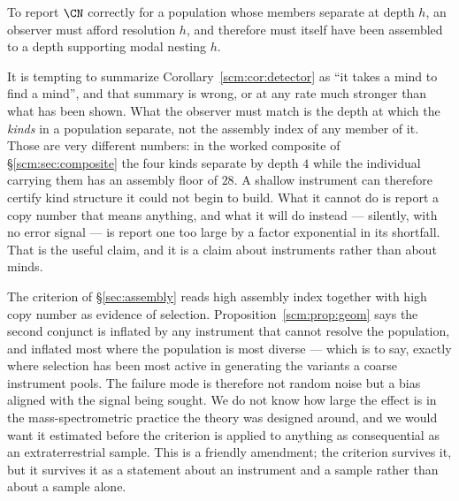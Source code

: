 \begin{corollary}
\label{scm:cor:detector}
To report $\CN$ correctly for a population whose members separate at depth
$h$, an observer must afford resolution $h$, and therefore must itself
have been assembled to a depth supporting modal nesting $h$.
\end{corollary}

\begin{remark}
\label{scm:rmk:notthatfar}
It is tempting to summarize Corollary~\ref{scm:cor:detector} as ``it takes
a mind to find a mind'', and that summary is wrong, or at any rate much
stronger than what has been shown. What the observer must match is the
depth at which the \emph{kinds} in a population separate, not the assembly
index of any member of it. Those are very different numbers: in the worked
composite of \S\ref{scm:sec:composite} the four kinds separate by depth
$4$ while the individual carrying them has an assembly floor of $28$. A
shallow instrument can therefore certify kind structure it could not begin
to build. What it cannot do is report a copy number that means anything,
and what it will do instead --- silently, with no error signal --- is
report one too large by a factor exponential in its shortfall. That is the
useful claim, and it is a claim about instruments rather than about minds.
\end{remark}

\begin{remark}
\label{scm:rmk:falsepos}
The criterion of \S\ref{sec:assembly} reads high assembly index together
with high copy number as evidence of selection.
Proposition~\ref{scm:prop:geom} says the second conjunct is inflated by
any instrument that cannot resolve the population, and inflated most where
the population is most diverse --- which is to say, exactly where selection
has been most active in generating the variants a coarse instrument pools.
The failure mode is therefore not random noise but a bias aligned with the
signal being sought. We do not know how large the effect is in the
mass-spectrometric practice the theory was designed around, and we would
want it estimated before the criterion is applied to anything as
consequential as an extraterrestrial sample. This is a friendly amendment;
the criterion survives it, but it survives it as a statement about an
instrument and a sample rather than about a sample alone.
\end{remark}

